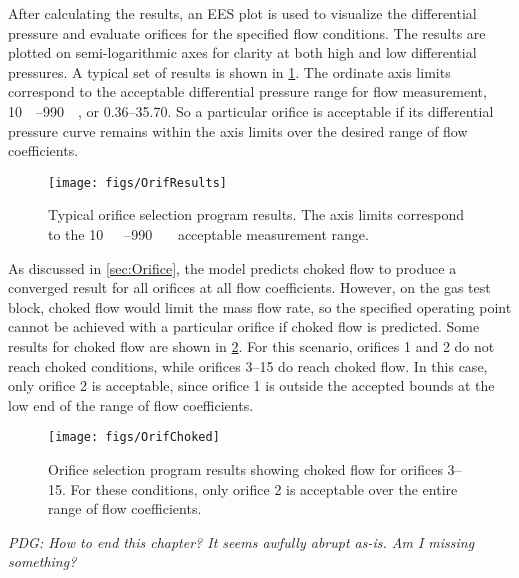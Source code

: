 After calculating the results, an EES plot is used to visualize
the differential pressure and evaluate orifices for the specified flow conditions.
The results are plotted on semi-logarithmic axes for clarity at both high and low
differential pressures.
A typical set of results is shown in \cref{fig:OrifResults}.
The ordinate axis limits correspond to the acceptable differential pressure range
for flow measurement, \SIrange{10}{990}{\inch{}}, or \SIrange{0.36}{35.70}{\psid}.
So a particular orifice is acceptable if its differential pressure curve remains 
within the axis limits over the desired range of flow coefficients.
\begin{figure}[htbp]
  \centering
  \texttt{[image: figs/OrifResults]}
  \caption{Typical orifice selection program results. The axis limits correspond
    to the \SIrange{10}{990}{\inch\protect{}} acceptable measurement range.}
  \label{fig:OrifResults}
\end{figure}

As discussed in \cref{sec:Orifice}, the model predicts choked flow to produce a
converged result for all orifices at all flow coefficients.
However, on the gas test block, choked flow would limit the mass flow rate, so
the specified operating point cannot be achieved with a particular orifice
if choked flow is predicted.
Some results for choked flow are shown in \cref{fig:OrifChoked}.
For this scenario, orifices 1 and 2 do not reach choked conditions, while
orifices 3--15 do reach choked flow.
In this case, only orifice 2 is acceptable, since orifice 1 is outside
the accepted bounds at the low end of the range of flow coefficients.
\begin{figure}[htbp]
  \centering
  \texttt{[image: figs/OrifChoked]}
  \caption{Orifice selection program results showing choked flow for orifices 3--15. 
    For these conditions, only orifice 2 is acceptable over the entire range of flow coefficients.}
  \label{fig:OrifChoked}
\end{figure}

\emph{PDG: How to end this chapter? It seems awfully abrupt as-is. Am I missing something?}